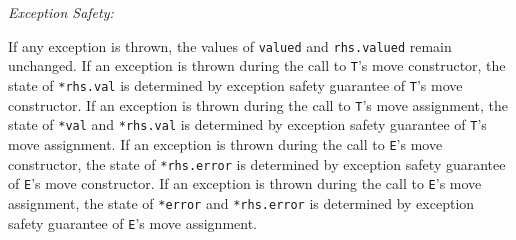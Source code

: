 \documentclass[a4paper,10pt]{article}
\newcommand{\cpp}[1]{\lstinline{#1}}
\newcommand{\wordingItem}[1]{\noindent\textit{#1:}}
\newenvironment{wordingTextItem}[1]{\wordingItem{#1}\vspace{7pt}\noindent\begin{adjustwidth}{12pt}{}}{\vspace{7pt}\end{adjustwidth}}
\newenvironment{wordingPara}{\begin{adjustwidth}{12pt}{}}{\end{adjustwidth}}
\begin{document}
\begin{wordingPara}
\begin{wordingTextItem}{Exception Safety}
If any exception is thrown, the values of \cpp{valued} and \cpp{rhs.valued} remain unchanged. If an exception is thrown during the call to \cpp{T}'s move constructor, the state of \cpp{*rhs.val} is determined by exception safety guarantee of \cpp{T}'s move constructor. If an exception is thrown during the call to \cpp{T}'s move assignment, the state of \cpp{*val} and \cpp{*rhs.val} is determined by exception safety guarantee of \cpp{T}'s move assignment. If an exception is thrown during the call to \cpp{E}'s move constructor, the state of \cpp{*rhs.error} is determined by exception safety guarantee of \cpp{E}'s move constructor. If an exception is thrown during the call to \cpp{E}'s move assignment, the state of \cpp{*error} and \cpp{*rhs.error} is determined by exception safety guarantee of \cpp{E}'s move assignment.
\end{wordingTextItem}
\end{wordingPara}
\end{document}
